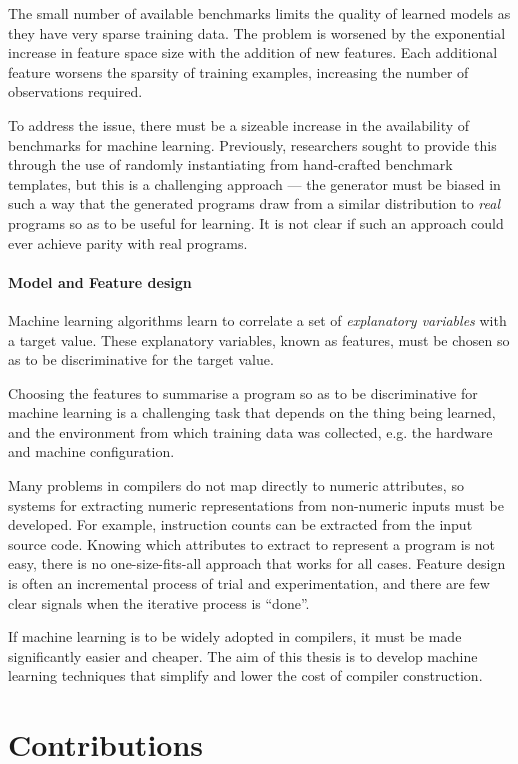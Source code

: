 The small number of available benchmarks limits the quality of learned models as they have very sparse training data. The problem is worsened by the exponential increase in feature space size with the addition of new features. Each additional feature worsens the sparsity of training examples, increasing the number of observations required.

To address the issue, there must be a sizeable increase in the availability of benchmarks for machine learning. Previously, researchers sought to provide this through the use of randomly instantiating from hand-crafted benchmark templates, but this is a challenging approach --- the generator must be biased in such a way that the generated programs draw from a similar distribution to \emph{real} programs so as to be useful for learning. It is not clear if such an approach could ever achieve parity with real programs.

\paragraph*{Model and Feature design} Machine learning algorithms learn to correlate a set of \emph{explanatory variables} with a target value. These explanatory variables, known as features, must be chosen so as to be discriminative for the target value.

Choosing the features to summarise a program so as to be discriminative for machine learning is a challenging task that depends on the thing being learned, and the environment from which training data was collected, e.g. the hardware and machine configuration.

Many problems in compilers do not map directly to numeric attributes, so systems for extracting numeric representations from non-numeric inputs must be developed. For example, instruction counts can be extracted from the input source code. Knowing which attributes to extract to represent a program is not easy, there is no one-size-fits-all approach that works for all cases. Feature design is often an incremental process of trial and experimentation, and there are few clear signals when the iterative process is ``done''.

If machine learning is to be widely adopted in compilers, it must be made significantly easier and cheaper. The aim of this thesis is to develop machine learning techniques that simplify and lower the cost of compiler construction.


\section{Contributions}

